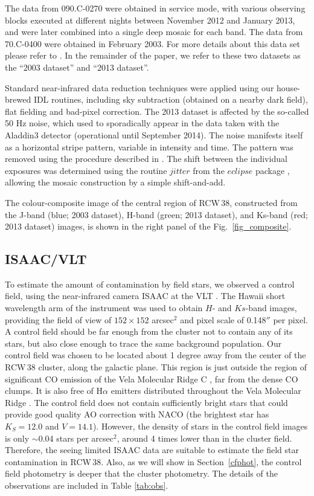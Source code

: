 \documentclass[a4paper,fleqn,usenatbib]{mnras}
\begin{document}
The data from 090.C-0270 were obtained in service mode, with various observing blocks executed at different nights between November 2012 and 
January 2013, and were later combined into a single deep mosaic for each band. The data from 70.C-0400 were obtained in February 2003. 
For more details about this data set please refer to \citet{derose09}. 
In the remainder of the paper, we refer to these two datasets as the ``2003 dataset'' and ``2013 dataset''.

Standard near-infrared data reduction techniques were applied using our house-brewed {\sc IDL} routines, including sky subtraction 
(obtained on a nearby dark field), flat fielding and bad-pixel correction. The 2013 dataset is affected by the so-called 50 Hz noise,
which used to sporadically appear in the data taken with the Aladdin3 detector (operational until September 2014). The noise manifests itself
as a horizontal stripe pattern, variable in intensity and time. The pattern was removed using the procedure described in \citet{hussmann12}.
The shift between the individual exposures was determined using the routine $jitter$ from the $eclipse$ package \citep{devillard97}, allowing the mosaic construction 
by a simple shift-and-add. 

The colour-composite image of the central region of RCW\,38, constructed from the J-band (blue; 2003 dataset), H-band (green; 2013 dataset), and Ks-band (red; 2013 dataset) images,   
 is shown in the right panel of the Fig.~\ref{fig_composite}.
 
\subsection{ISAAC/VLT}

To estimate the amount of contamination by field stars, we observed a control field, using the near-infrared camera ISAAC at the VLT \citep{moorwood98}. 
The Hawaii short wavelength arm of the instrument was used to obtain $H$- and $Ks$-band images, providing the field of view of 
$152\times152$ arcsec$^2$ and pixel scale of 0.148$''$ per pixel. 
A control field should be far enough from the cluster not to contain any of its stars, but also close enough to trace the same background population.  
Our control field was chosen to be located about 1 degree away from the center of the RCW$\,$38 cluster, along the galactic plane. This region
is just outside the region of significant CO emission of the Vela Molecular Ridge C \citep{yamaguchi99}, far from the dense CO clumps. 
It is also free of H$\alpha$ emitters distributed throughout the Vela Molecular Ridge \citep{pettersson08}.
The control field does not contain sufficiently bright stars that could provide good quality AO correction with NACO (the brightest star has $K_S=12.0$ and $V=14.1$). 
However, the density of stars in the control field images is only $\sim$0.04 stars per arcsec$^2$, around 4 times lower than in the cluster field.
Therefore, the seeing limited ISAAC data are suitable to estimate the field star contamination in RCW\,38.
Also, as we will show in Section~\ref{cfphot}, the control field photometry is deeper that the cluster photometry.
The details of the observations are included in Table \ref{tab:obs}. 
\end{document}
